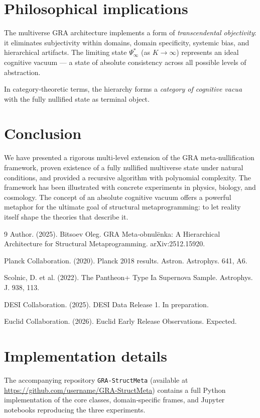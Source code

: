 \documentclass[12pt]{article}
\theoremstyle{definition}
\begin{document}
\section{Philosophical implications}
\label{sec:philosophy}

The multiverse GRA architecture implements a form of \emph{transcendental objectivity}: it eliminates subjectivity within domains, domain specificity, systemic bias, and hierarchical artifacts. The limiting state \(\Psi_{\infty}^*\) (as \(K\to\infty\)) represents an ideal cognitive vacuum — a state of absolute consistency across all possible levels of abstraction.

In category‑theoretic terms, the hierarchy forms a \emph{category of cognitive vacua} with the fully nullified state as terminal object.

\section{Conclusion}
\label{sec:conclusion}

We have presented a rigorous multi‑level extension of the GRA meta‑nullification framework, proven existence of a fully nullified multiverse state under natural conditions, and provided a recursive algorithm with polynomial complexity. The framework has been illustrated with concrete experiments in physics, biology, and cosmology. The concept of an absolute cognitive vacuum offers a powerful metaphor for the ultimate goal of structural metaprogramming: to let reality itself shape the theories that describe it.

\begin{thebibliography}{9}
Author. (2025). Bitsoev Oleg. GRA Meta‑obnulënka: A Hierarchical Architecture for Structural Metaprogramming. arXiv:2512.15920.

Planck Collaboration. (2020). Planck 2018 results. Astron. Astrophys. 641, A6.

Scolnic, D. et al. (2022). The Pantheon+ Type Ia Supernova Sample. Astrophys. J. 938, 113.

DESI Collaboration. (2025). DESI Data Release 1. In preparation.

Euclid Collaboration. (2026). Euclid Early Release Observations. Expected.
\end{thebibliography}

\appendix
\section{Implementation details}
The accompanying repository \texttt{GRA-StructMeta} (available at \url{https://github.com/username/GRA-StructMeta}) contains a full Python implementation of the core classes, domain‑specific frames, and Jupyter notebooks reproducing the three experiments.
\end{document}
